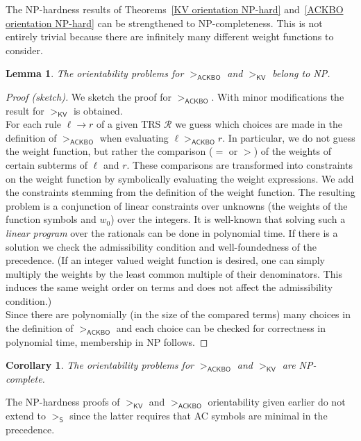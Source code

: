 \documentclass{tlp}
\newcommand{\qed}{\hspace*{1em}\hbox{\proofbox}}
\newtheorem{corollary}[theorem]{Corollary}
\newtheorem{lemma}[theorem]{Lemma}
\newcommand{\m}[1]{\mathsf{#1}}
\newcommand{\mc}[1]{\mathcal{#1}}
\newcommand{\mr}[1]{\mathrm{#1}}
\newcommand{\ackbo}{\mr{\m{ACKBO}}}
\newcommand{\steinbach}{\mr{\m{S}}}
\newcommand{\KV}{\mr{\m{KV}}}
\newcommand{\RR}{\mc{R}}
\begin{document}
The NP-hardness results of Theorems~\ref{KV orientation NP-hard}
and~\ref{ACKBO orientation NP-hard} can be strengthened to
NP-completeness. This is not entirely trivial because there are
infinitely many different weight functions to consider.

\begin{lemma}
\label{ACKBO in NP}
The orientability problems for $>_\ackbo$ and $>_\KV$ belong to NP.
\end{lemma}

\begin{proof}[Proof (sketch)]
We sketch the proof for $>_\ackbo$.
With minor modifications the result for $>_\KV$ is obtained.
\\\indent
For each rule $\ell \to r$ of a given TRS $\RR$ we guess which choices are
made in the definition of $>_\ackbo$ when evaluating $\ell >_\ackbo r$.
In particular, we do not guess the weight function, but rather the
comparison ($=$ or $>$) of the weights of certain subterms of $\ell$ and
$r$. These comparisons are transformed into constraints on the weight
function by symbolically evaluating the weight expressions.
We add the constraints stemming from the definition of the weight 
function. The resulting
problem is a conjunction of linear constraints over unknowns (the weights
of the function symbols and $w_0$) over the integers.
It is well-known \cite[Section~10.3]{S86} that solving such a
\emph{linear program} over the rationals can be done in polynomial time.
If there is a solution we check
the admissibility condition and well-foundedness of the precedence.
(If an integer valued weight function is desired, one can simply multiply
the weights by the least common multiple of their denominators. This
induces the same weight order on terms and does not affect the
admissibility condition.)
\\\indent
Since there are polynomially (in the size of the compared terms) many
choices in the definition of $>_\ackbo$
and each choice can be checked for correctness in polynomial time,
membership in NP follows.
\end{proof}

\begin{corollary}
The orientability problems for $>_\ackbo$ and $>_\KV$ are NP-complete.
\qed
\end{corollary}

The NP-hardness proofs of $>_\KV$ and $>_\ackbo$ orientability given
earlier do not extend to $>_\steinbach$ since the latter requires that
AC symbols are minimal in the precedence.
\end{document}
